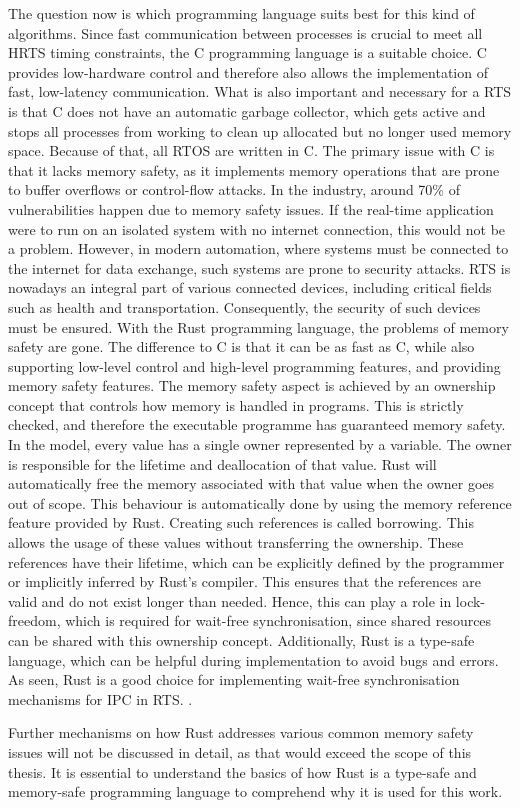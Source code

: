 The question now is which programming language suits best for this kind of algorithms. Since fast communication between processes is crucial to meet all \ac{HRTS} timing constraints, the C programming language is a suitable choice. C provides low-hardware control and therefore also allows the implementation of fast, low-latency communication. What is also important and necessary for a \ac{RTS} is that C does not have an automatic garbage collector, which gets active and stops all processes from working to clean up allocated but no longer used memory space. Because of that, all \ac{RTOS} are written in C. The primary issue with C is that it lacks memory safety, as it implements memory operations that are prone to buffer overflows or control-flow attacks. In the industry, around 70\% of vulnerabilities happen due to memory safety issues. If the real-time application were to run on an isolated system with no internet connection, this would not be a problem. However, in modern automation, where systems must be connected to the internet for data exchange, such systems are prone to security attacks. \ac{RTS} is nowadays an integral part of various connected devices, including critical fields such as health and transportation. Consequently, the security of such devices must be ensured. With the Rust programming language, the problems of memory safety are gone. The difference to C is that it can be as fast as C, while also supporting low-level control and high-level programming features, and providing memory safety features. The memory safety aspect is achieved by an ownership concept that controls how memory is handled in programs. This is strictly checked, and therefore the executable programme has guaranteed memory safety. In the model, every value has a single owner represented by a variable. The owner is responsible for the lifetime and deallocation of that value. Rust will automatically free the memory associated with that value when the owner goes out of scope. This behaviour is automatically done by using the memory reference feature provided by Rust. Creating such references is called borrowing. This allows the usage of these values without transferring the ownership. These references have their lifetime, which can be explicitly defined by the programmer or implicitly inferred by Rust's compiler. This ensures that the references are valid and do not exist longer than needed. Hence, this can play a role in lock-freedom, which is required for wait-free synchronisation, since shared resources can be shared with this ownership concept. Additionally, Rust is a type-safe language, which can be helpful during implementation to avoid bugs and errors. As seen, Rust is a good choice for implementing wait-free synchronisation mechanisms for \ac{IPC} in \ac{RTS}. \cite{xu2023rust, culic2022lowRust}. 

Further mechanisms on how Rust addresses various common memory safety issues will not be discussed in detail, as that would exceed the scope of this thesis. It is essential to understand the basics of how Rust is a type-safe and memory-safe programming language to comprehend why it is used for this work.
